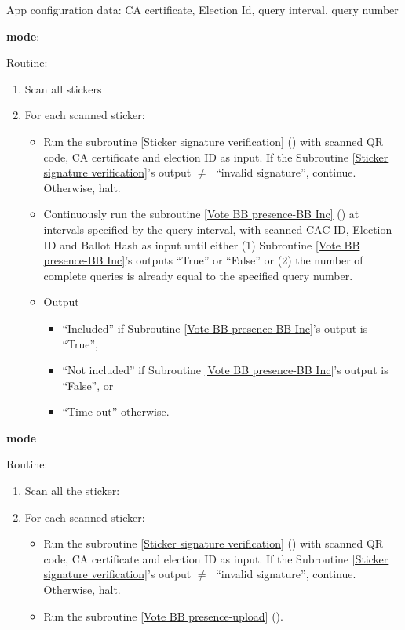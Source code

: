 \documentclass{article}
\begin{document}
App configuration data: CA certificate, Election Id, query interval, query number

\textbf{\BBInclusionCheck{} mode}:


Routine:
\begin{enumerate}
    \item Scan all stickers
    \item For each scanned sticker:
    \begin{itemize}
        \item Run the subroutine \ref{Sticker signature verification} (\StickersignatureVerification{}) with scanned QR code, CA certificate and election ID as input. If the Subroutine \ref{Sticker signature verification}'s output $\neq\;$ ``invalid signature'', continue. Otherwise, halt.
    \item Continuously run the subroutine \ref{Vote BB presence-BB Inc} (\BBInclusionCheck{}) at intervals specified by the query interval, with scanned CAC ID, Election ID and Ballot Hash as input until either (1) Subroutine \ref{Vote BB presence-BB Inc}'s outputs ``True'' or ``False'' or (2) the number of complete queries is already equal to the specified query number. 
    \item Output 
    \begin{itemize}
        \item ``Included'' if Subroutine \ref{Vote BB presence-BB Inc}'s output is ``True'',
        \item ``Not included'' if Subroutine \ref{Vote BB presence-BB Inc}'s output is ``False'', or
        \item ``Time out'' otherwise.
    \end{itemize}
    \end{itemize}
\end{enumerate}

\textbf{\StickerBBUpload{}{} mode}

Routine:
\begin{enumerate}
    \item Scan all the sticker:
    \item For each scanned sticker:
    \begin{itemize}

        \item Run the subroutine \ref{Sticker signature verification} (\StickersignatureVerification{}) with scanned QR code, CA certificate and election ID as input. If the Subroutine \ref{Sticker signature verification}'s output $\neq\;$ ``invalid signature'', continue. Otherwise, halt.
        \item Run the subroutine \ref{Vote BB presence-upload} (\StickerBBUpload{}).
    \end{itemize}
\end{enumerate}
\end{document}
